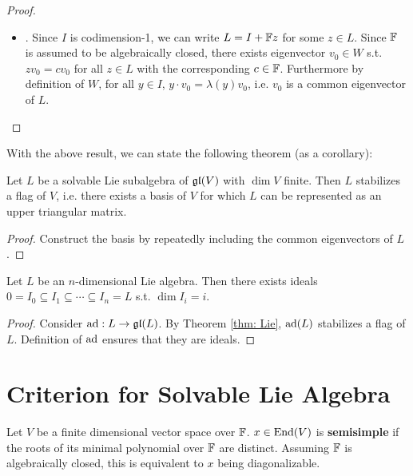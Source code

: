 \documentclass{article}
\begin{document}
\begin{proof}
\begin{itemize}
        \item {}. Since $I$ is codimension-1, we can write $L = I + \mathbb{F} z$ for some $z \in L$. Since $\mathbb{F}$ is assumed to be algebraically closed, there exists eigenvector $v_0 \in W$ s.t. $z v_0 = c v_0$ for all $z \in L$ with the corresponding $c \in \mathbb{F}$. Furthermore by definition of $W$, for all $y \in I$, $y \cdot v_0 = \lambda(y) v_0$, i.e. $v_0$ is a common eigenvector of $L$. 
    \end{itemize}
\end{proof}

\textstart
With the above result, we can state the following theorem (as a corollary):

\begin{theorem}[Lie]\label{thm: Lie}
    Let $L$ be a solvable Lie subalgebra of $\mathfrak{gl}(V)$ with $\dim V$ finite. Then $L$ stabilizes a flag of $V$, i.e. there exists a basis of $V$ for which $L$ can be represented as an upper triangular matrix.
\end{theorem}

\begin{proof}
    Construct the basis by repeatedly including the common eigenvectors of $L$.
\end{proof}

\begin{corollary}
    Let $L$ be an $n$-dimensional Lie algebra. Then there exists ideals $0 = I_0 \subseteq I_1 \subseteq \cdots \subseteq I_n = L$ s.t. $\dim I_i = i$.
\end{corollary}

\begin{proof}
    Consider $\operatorname{ad}: L \to \mathfrak{gl}(L)$. By Theorem \ref{thm: Lie}, $\operatorname{ad}(L)$ stabilizes a flag of $L$. Definition of $\operatorname{ad}$ ensures that they are ideals.
\end{proof}

\section{Criterion for Solvable Lie Algebra}

\begin{definition}
    Let $V$ be a finite dimensional vector space over $\mathbb{F}$. $x \in \mathrm{End}(V)$ is \textbf{semisimple} if the roots of its minimal polynomial over $\mathbb{F}$ are distinct. Assuming $\mathbb{F}$ is algebraically closed, this is equivalent to $x$ being diagonalizable.
\end{definition}
\end{document}
